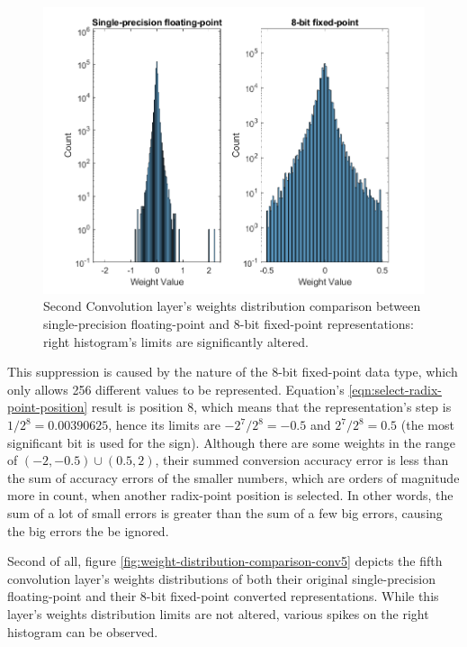 \begin{figure} [H]
	\centering
	\includegraphics[scale=0.9]{Images/Weights-distributions/original-vs-fixed8/weight-distribution-conv2.png}
	\decoRule
	\caption[Second Convolution layer's weights distribution comparison between single-precision floating-point and 8-bit fixed-point representations]{Second Convolution layer's weights distribution comparison between single-precision floating-point and 8-bit fixed-point representations: right histogram's limits are significantly altered.}
	\label{fig:weight-distribution-comparison-conv2}
\end{figure}

This suppression is caused by the nature of the 8-bit fixed-point data type, which only allows 256 different values to be represented. Equation's \ref{eqn:select-radix-point-position} result is position 8, which means that the representation's step is $1/2^8 = 0.00390625$, hence its limits are $-2^7/2^8 = -0.5$ and $2^7/2^8 = 0.5$ (the most significant bit is used for the sign). Although there are some weights in the range of $(-2, -0.5) \cup (0.5, 2)$, their summed conversion accuracy error is less than the sum of accuracy errors of the smaller numbers, which are orders of magnitude more in count, when another radix-point position is selected. In other words, the sum of a lot of small errors is greater than the sum of a few big errors, causing the big errors the be ignored.

Second of all, figure \ref{fig:weight-distribution-comparison-conv5} depicts the fifth convolution layer's weights distributions of both their original single-precision floating-point and their 8-bit fixed-point converted representations. While this layer's weights distribution limits are not altered, various spikes on the right histogram can be observed.

